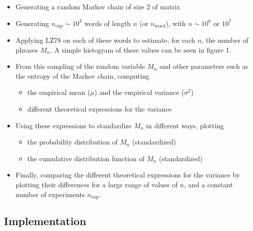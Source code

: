 \begin{itemize}

	\item Generating a random Markov chain of size 2 of matrix
 \item
 Generating $n_{\text{exp}} \sim 10^3$ words of length $n $ (or $n_{\text{word}}$), with $n \sim 10^6 \text{ or } 10^7$
 
 \item Applying LZ78 on each of these words to estimate, for each $n$,
 the number of phrases $M_n$. A simple histogram of these values
 can be seen in figure 1.
 
 \item From this sampling of the random variable $M_n$ and other parameters such as the entropy of the Markov chain, computing
 
 	\begin{itemize}
 		\item the empirical mean ($\mu$) and the empirical variance ($\sigma^2$)
 		\item different theoretical expressions for the variance
 	\end{itemize}
 	
 \item Using these expressions to standardize $M_n$ in different ways, plotting
 
 	\begin{itemize}
 		\item the probability distribution of $M_n$ (standardized)
 			  
 		\item the cumulative distribution function of $M_n$ (standardized)
 	\end{itemize}
 
 \item Finally, comparing the different theoretical expressions for the variance 
 by plotting their differences for a large range of values of $n$, and
 a constant number of experiments $n_{\text{exp}}$.
\end{itemize}

\subsection{ Implementation }

